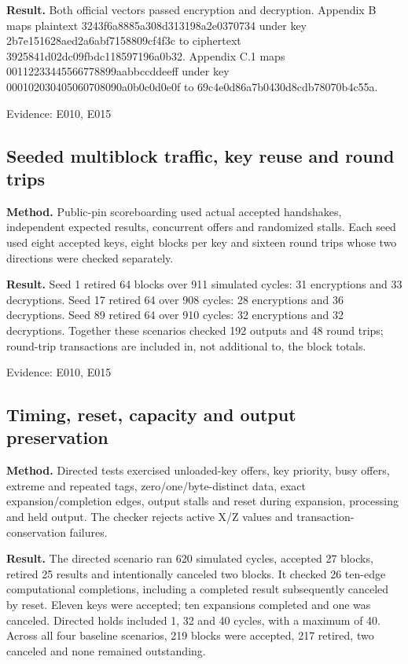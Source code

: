\documentclass[11pt,a4paper]{article}
\begin{document}
\textbf{Result.} Both official vectors passed encryption and decryption. Appendix B maps plaintext 3243f6a8885a308d313198a2e0370734 under key 2b7e151628aed2a6abf7158809cf4f3c to ciphertext 3925841d02dc09fbdc118597196a0b32. Appendix C.1 maps 00112233445566778899aabbccddeeff under key 000102030405060708090a0b0c0d0e0f to 69c4e0d86a7b0430d8cdb78070b4c55a.

{\small Evidence: E010,\allowbreak{} E015}

\subsection{Seeded multiblock traffic,\allowbreak{} key reuse and round trips}

\textbf{Method.} Public-pin scoreboarding used actual accepted handshakes,\allowbreak{} independent expected results,\allowbreak{} concurrent offers and randomized stalls. Each seed used eight accepted keys,\allowbreak{} eight blocks per key and sixteen round trips whose two directions were checked separately.

\textbf{Result.} Seed 1 retired 64 blocks over 911 simulated cycles: 31 encryptions and 33 decryptions. Seed 17 retired 64 over 908 cycles: 28 encryptions and 36 decryptions. Seed 89 retired 64 over 910 cycles: 32 encryptions and 32 decryptions. Together these scenarios checked 192 outputs and 48 round trips; round-trip transactions are included in,\allowbreak{} not additional to,\allowbreak{} the block totals.

{\small Evidence: E010,\allowbreak{} E015}

\subsection{Timing,\allowbreak{} reset,\allowbreak{} capacity and output preservation}

\textbf{Method.} Directed tests exercised unloaded-key offers,\allowbreak{} key priority,\allowbreak{} busy offers,\allowbreak{} extreme and repeated tags,\allowbreak{} zero/\allowbreak{}one/\allowbreak{}byte-distinct data,\allowbreak{} exact expansion/\allowbreak{}completion edges,\allowbreak{} output stalls and reset during expansion,\allowbreak{} processing and held output. The checker rejects active X/\allowbreak{}Z values and transaction-conservation failures.

\textbf{Result.} The directed scenario ran 620 simulated cycles,\allowbreak{} accepted 27 blocks,\allowbreak{} retired 25 results and intentionally canceled two blocks. It checked 26 ten-edge computational completions,\allowbreak{} including a completed result subsequently canceled by reset. Eleven keys were accepted; ten expansions completed and one was canceled. Directed holds included 1,\allowbreak{} 32 and 40 cycles,\allowbreak{} with a maximum of 40. Across all four baseline scenarios,\allowbreak{} 219 blocks were accepted,\allowbreak{} 217 retired,\allowbreak{} two canceled and none remained outstanding.
\end{document}
